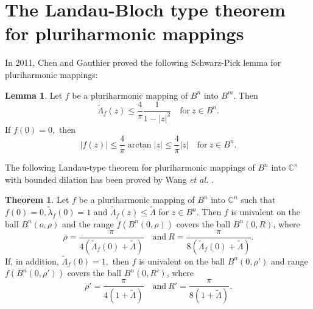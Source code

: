\documentclass[a4paper,12pt,reqno]{amsart}
\theoremstyle{plain}
\theoremstyle{definition}
\newtheorem{Thm}{Theorem}
\newtheorem{Lem}{Lemma}
\newcommand{\IC}{{\mathbb C}}
\numberwithin{equation}{section}
\begin{document}
\section{The Landau-Bloch type theorem for pluriharmonic mappings}

In 2011, Chen and Gauthier \cite{Chen-Gauthier-2011} proved the following Schwarz-Pick lemma for pluriharmonic mappings:
\begin{Lem}\label{lemma3}\cite{Chen-Gauthier-2011}
Let $f$ be a pluriharmonic mapping of $B^n$ into $B^m$. Then 
$$
\widetilde{\Lambda}_f(z)\leq \frac{4}{\pi}\frac{1}{1-|z|^2}\quad \text{for}\ z\in B^n.
$$
If $f(0)=0,$ then
$$
|f(z)|\leq \frac{4}{\pi}\arctan|z|\leq \frac{4}{\pi}|z|\quad\text{for} \ z\in B^n.
$$
\end{Lem}

The following Landau-type theorem for pluriharmonic mappings of $B^n$ into $\IC^n$ with bounded dilation has been proved by Wang {\it{et al.}} \cite{Wang-Yang-Liu-2022}.
\begin{Thm}\cite{Wang-Yang-Liu-2022}\label{Wang-2022}
Let $f$ be a pluriharmonic mapping of $B^n$ into $\IC^n$ such that $f(0)=0, \widetilde{\lambda}_f(0)=1$ and $\widetilde{\Lambda}_f(z)\leq \widetilde{\Lambda}$ for $z\in B^n$. Then $f$ is univalent on the ball $B^n(o,\rho)$ and the range $f(B^n(0,\rho))$ covers the ball $B^n(0,R)$, where
$$\rho=\frac{\pi}{4(\widetilde{\Lambda}_f(0)+\widetilde{\Lambda})}\quad\text{and}\ R=\frac{\pi}{8(\widetilde{\Lambda}_f(0)+\widetilde{\Lambda})}.$$
If, in addition, $\widetilde{\Lambda}_f(0)=1,$ then $f$ is univalent on the ball $B^n(0,\rho')$ and range $f(B^n(0,\rho'))$ covers the ball $B^n(0,R')$, where
$$\rho'=\frac{\pi}{4(1+\widetilde{\Lambda})}\quad\text{and}\ R'=\frac{\pi}{8(1+\widetilde{\Lambda})}.$$
\end{Thm}
\end{document}
